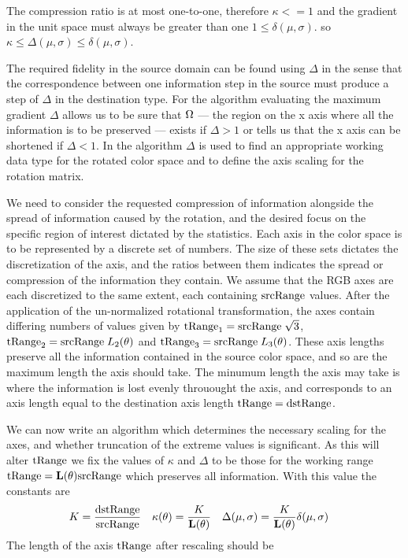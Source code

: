 The compression ratio is at most one-to-one, therefore $\kappa <=1$ and the gradient in the unit space must always be greater than one $1 \le \delta(\mu,\sigma)$. so $ \kappa \le \Delta(\mu,\sigma) \le \delta(\mu,\sigma)$.

The required fidelity in the source domain can be found using $ \Delta$ in the sense that the correspondence between one information step in the source must produce a step of $\Delta$ in the destination type. For the algorithm evaluating the maximum gradient $\Delta$ allows us to be sure that  $\Omega$ --- the region on the x axis where all the information is to be preserved --- exists if $\Delta >1$ or tells us that the x axis can be shortened if  $\Delta < 1$. In the algorithm $\Delta$ is used to find an appropriate working data type for the rotated color space and to define the axis scaling for the rotation matrix.


We need to consider the requested compression of information alongside the spread of information caused by the rotation, and the desired focus on the specific region of interest dictated by the statistics. Each axis in the color space is to be represented by a discrete set of numbers. The size of these sets dictates the discretization of the axis, and the ratios between them indicates the spread or compression of the information they contain. We assume that the RGB axes are each discretized to the same extent, each containing $\text{srcRange}$ values. After the application of the un-normalized rotational transformation, the axes contain differing numbers of values given by $\text{tRange}_1 =\text{srcRange} \; \sqrt{3} $, $\text{tRange}_2 = \text{srcRange} \; L_2(\theta) $  and $\text{tRange}_3 = \text{srcRange} \; L_3(\theta)$. These axis lengths preserve all the information contained in the source color space, and so are the maximum length the axis should take. The minumum length the axis may take is where the information is lost evenly throuought the axis, and corresponds to an axis length equal to the destination axis length $\text{tRange} = \text{dstRange}$. 

We can now write an algorithm which determines the necessary scaling for the axes, and whether truncation of the extreme values is significant.
As this will alter $\text{tRange}$ we fix the values of $\kappa$ and $\Delta$ to be those for the working range $\text{tRange} = \mathbf{L}(\theta) \text{srcRange}$  which preserves all information. With this value the constants are
\begin{align}
K & =  \frac{\text{dstRange}}{\text{srcRange}}  &
\kappa(\theta) &=  \frac{K}{\mathbf{L}(\theta)}  & 
\Delta(\mu,\sigma)  &= \frac{K}{\mathbf{L}(\theta)} \delta(\mu,\sigma)  
\end{align}
The length of the axis $\text{tRange}$ after rescaling should be

